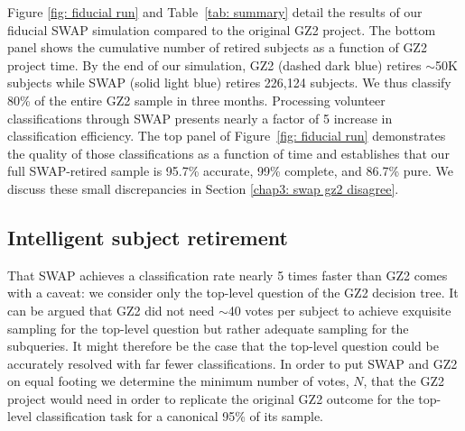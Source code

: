 Figure \ref{fig: fiducial run} and Table~\ref{tab: summary} detail the results of our fiducial SWAP simulation compared to the original GZ2 project. The bottom panel shows the cumulative number of retired subjects as a function of GZ2 project time. By the end of our simulation, GZ2 (dashed dark blue) retires $\sim$50K subjects while SWAP (solid light blue) retires 226,124 subjects. We thus classify 80\% of the entire GZ2 sample in three months. Processing volunteer classifications through SWAP presents nearly a factor of 5 increase in classification efficiency. The top panel of Figure~\ref{fig: fiducial run} demonstrates the quality of those classifications as a function of time and establishes that our full SWAP-retired sample is 95.7\% accurate, 99\% complete, and 86.7\% pure. We discuss these small discrepancies in Section \ref{chap3: swap gz2 disagree}.




\subsection{Intelligent subject retirement}\label{chap3: swap is faster}

That SWAP achieves a classification rate nearly 5 times faster than GZ2 comes with a caveat: we consider only the top-level question of the GZ2 decision tree. It can be argued that GZ2 did not need $\sim$40 votes per subject to achieve exquisite sampling for the top-level question but rather adequate sampling for the subqueries. It might therefore be the case that the top-level question could be accurately resolved with far fewer classifications. In order to put SWAP and GZ2 on equal footing we determine the minimum number of votes, $N$, that the GZ2 project would need in order to replicate the original GZ2 outcome for the top-level  classification task for a canonical 95\% of its sample.

